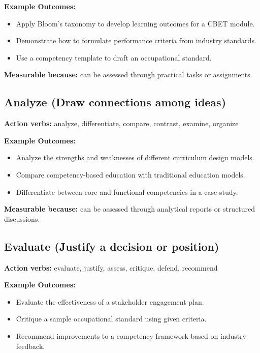 \documentclass[12pt]{article}
\begin{document}
\textbf{Example Outcomes:}

\begin{itemize}
    \item Apply Bloom's taxonomy to develop learning outcomes for a CBET module.
    \item Demonstrate how to formulate performance criteria from industry standards.
    \item Use a competency template to draft an occupational standard.
\end{itemize}

\textbf{Measurable because:} can be assessed through practical tasks or assignments.

\subsection{Analyze (Draw connections among ideas)}

\textbf{Action verbs:} analyze, differentiate, compare, contrast, examine, organize

\textbf{Example Outcomes:}

\begin{itemize}
    \item Analyze the strengths and weaknesses of different curriculum design models.
    \item Compare competency-based education with traditional education models.
    \item Differentiate between core and functional competencies in a case study.
\end{itemize}

\textbf{Measurable because:} can be assessed through analytical reports or structured discussions.

\subsection{Evaluate (Justify a decision or position)}

\textbf{Action verbs:} evaluate, justify, assess, critique, defend, recommend

\textbf{Example Outcomes:}

\begin{itemize}
    \item Evaluate the effectiveness of a stakeholder engagement plan.
    \item Critique a sample occupational standard using given criteria.
    \item Recommend improvements to a competency framework based on industry feedback.
\end{itemize}
\end{document}
